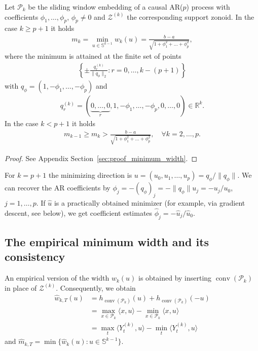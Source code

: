 \begin{Prop}\label{prop:minimum_width}
    Let $\mathcal{P}_k$ be the sliding window embedding of a causal AR($p$) process with coefficients $\phi_1,\dots,\phi_p$, $\phi_p\ne0$ and $\mathcal{Z}^{(k)}$ the corresponding support zonoid. In the case $k\ge p+1$ it holds
    \begin{align*}
        m_k=\min_{u\in\mathbb{S}^{k-1}}w_k(u)=\frac{b-a}{\sqrt{1+\phi_1^2+\dots+\phi_p^2}},
    \end{align*}
    where the minimum is attained at the finite set of points
    \begin{align}\label{eq:minimizers}
        \left\{\pm\frac{q_r^{(k)}}{\|q_{\phi}\|_2}:r=0,\dots,k-(p+1)\right\}
    \end{align}
    with $q_{\phi}=(1,-\phi_1,\dots,-\phi_p)$ and
    \begin{align*}
        q_r^{(k)}=(\underbrace{0,\dots,0}_{r},1,-\phi_1,\dots,-\phi_p,0,\dots,0)\in\mathbb{R}^{k}.
    \end{align*}
    In the case $k<p+1$ it holds
    \begin{align*}
        m_{k-1}\ge m_k>\frac{b-a}{\sqrt{1+\phi_1^2+\dots+\phi_p^2}},\quad\forall k=2,\dots,p.
    \end{align*}
\end{Prop}

\begin{proof}
    See Appendix Section~\ref{sec:proof_minimum_width}.
\end{proof}

\begin{Rem}\label{rem:minimizer_estimates_coefficients}
    For $k=p+1$ the minimizing direction is $u=(u_0,u_1,\dots,u_p)=q_{\phi}/\|q_{\phi}\|$. We can recover the AR coefficients by $\phi_j=-(q_{\phi})_j=-\|q_{\phi}\|u_j=-u_j/u_0$, $j=1,\dots,p$. If $\hat{u}$ is a practically obtained minimizer (for example, via gradient descent, see below), we get coefficient estimates $\hat{\phi}_j=-\hat{u}_j/\hat{u}_0$.
\end{Rem}

\subsection{The empirical minimum width and its consistency}\label{sec:emp_min_width}

An empirical version of the width $w_k(u)$ is obtained by inserting $\operatorname{conv}(\mathcal{P}_k)$ in place of $\mathcal{Z}^{(k)}$. Consequently, we obtain
\begin{align*}
    \hat{w}_{k,T}(u)&=h_{\operatorname{conv}(\mathcal{P}_k)}(u)+h_{\operatorname{conv}(\mathcal{P}_k)}(-u)\\&
    =\max_{x\in\mathcal{P}_k}\langle x,u\rangle-\min_{x\in\mathcal{P}_k}\langle x,u\rangle\\&
    =\max_t\langle Y_t^{(k)},u\rangle-\min_t\langle Y_t^{(k)},u\rangle
\end{align*}
and $\hat{m}_{k,T}=\min\{\hat{w}_k(u):u\in\mathbb{S}^{k-1}\}$.

